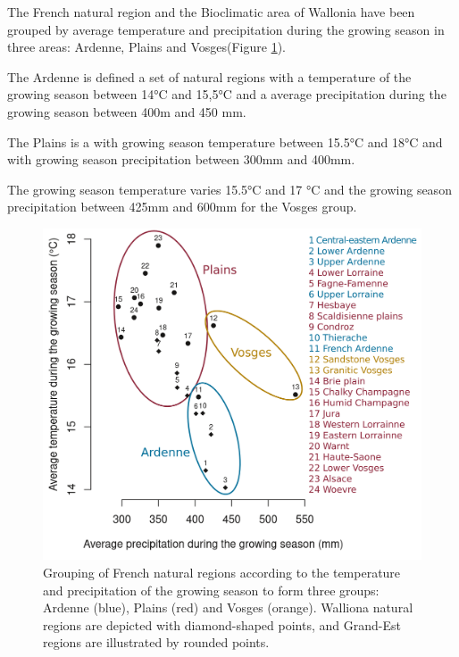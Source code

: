\documentclass[3p,procedia]{elsarticle}
\begin{document}
The French natural region and the Bioclimatic area of Wallonia have been grouped by average temperature and precipitation during the growing season  in three areas: Ardenne, Plains and Vosges(Figure \ref{fig:clim}).




The Ardenne is defined a set of natural regions with a temperature of the growing season between 14°C and 15,5°C and a average precipitation during the growing season between 400m and 450 mm.
 
The Plains is a  with growing season temperature between 15.5°C and 18°C and with growing season  precipitation between 300mm and 400mm.
 
The growing season temperature varies 15.5°C and 17 °C and the growing season precipitation between 425mm and 600mm for the Vosges group.


 

\begin{figure}
	\centering
\includegraphics[width=0.8\linewidth]{climat/climat_region.png}
\caption{Grouping of French natural regions according to the temperature and precipitation of the growing season to form three groups: Ardenne (blue), Plains (red) and Vosges (orange). Walliona natural regions are depicted with diamond-shaped points, and Grand-Est regions are illustrated by rounded points.}
	\label{fig:clim}
\end{figure}

\end{document}
